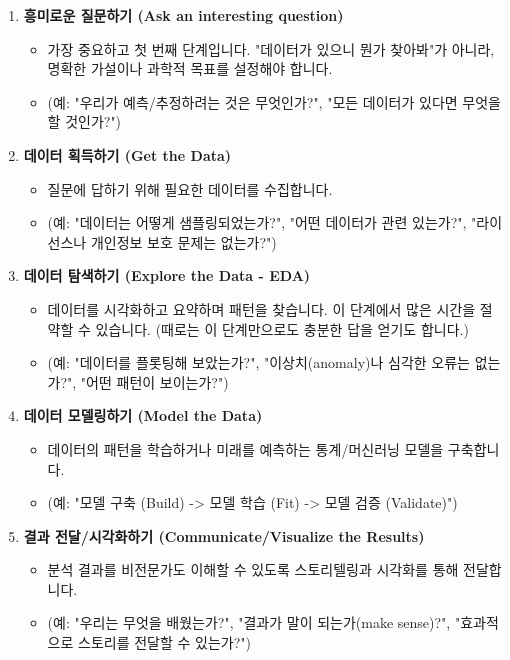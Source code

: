 \documentclass[11pt,a4paper]{book}
\theoremstyle{definition}
\begin{document}
\begin{enumerate}
    \item \textbf{흥미로운 질문하기 (Ask an interesting question)}
    \begin{itemize}
        \item 가장 중요하고 첫 번째 단계입니다. "데이터가 있으니 뭔가 찾아봐"가 아니라, 명확한 가설이나 과학적 목표를 설정해야 합니다.
        \item (예: "우리가 예측/추정하려는 것은 무엇인가?", "모든 데이터가 있다면 무엇을 할 것인가?")
    \end{itemize}
    \item \textbf{데이터 획득하기 (Get the Data)}
    \begin{itemize}
        \item 질문에 답하기 위해 필요한 데이터를 수집합니다.
        \item (예: "데이터는 어떻게 샘플링되었는가?", "어떤 데이터가 관련 있는가?", "라이선스나 개인정보 보호 문제는 없는가?")
    \end{itemize}
    \item \textbf{데이터 탐색하기 (Explore the Data - EDA)}
    \begin{itemize}
        \item 데이터를 시각화하고 요약하며 패턴을 찾습니다. 이 단계에서 많은 시간을 절약할 수 있습니다. (때로는 이 단계만으로도 충분한 답을 얻기도 합니다.)
        \item (예: "데이터를 플롯팅해 보았는가?", "이상치(anomaly)나 심각한 오류는 없는가?", "어떤 패턴이 보이는가?")
    \end{itemize}
    \item \textbf{데이터 모델링하기 (Model the Data)}
    \begin{itemize}
        \item 데이터의 패턴을 학습하거나 미래를 예측하는 통계/머신러닝 모델을 구축합니다.
        \item (예: "모델 구축 (Build) -> 모델 학습 (Fit) -> 모델 검증 (Validate)")
    \end{itemize}
    \item \textbf{결과 전달/시각화하기 (Communicate/Visualize the Results)}
    \begin{itemize}
        \item 분석 결과를 비전문가도 이해할 수 있도록 스토리텔링과 시각화를 통해 전달합니다.
        \item (예: "우리는 무엇을 배웠는가?", "결과가 말이 되는가(make sense)?", "효과적으로 스토리를 전달할 수 있는가?")
    \end{itemize}
\end{enumerate}
\end{document}
